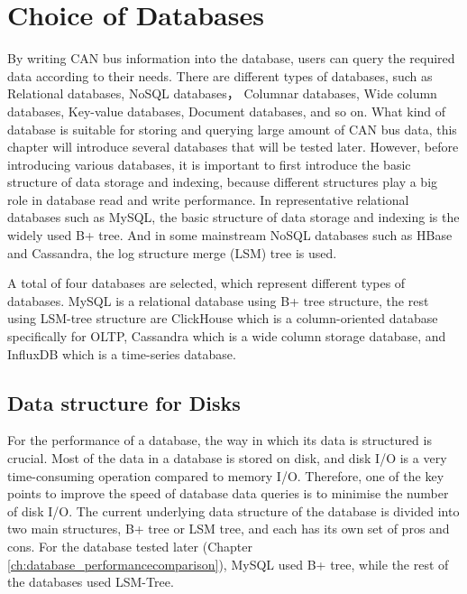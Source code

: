 \chapter{Choice of Databases}
\label{ch:choice_of_databases}
By writing CAN bus information into the database, users can query the required data according to their needs. There are different types of databases, such as Relational databases, NoSQL databases， Columnar databases, Wide column databases, Key-value databases, Document databases, and so on. What kind of database is suitable for storing and querying large amount of CAN bus data, this chapter will introduce several databases that will be tested later. However, before introducing various databases, it is important to first introduce the basic structure of data storage and indexing, because different structures play a big role in database read and write performance. In representative relational databases such as MySQL, the basic structure of data storage and indexing is the widely used B+ tree. And in some mainstream NoSQL databases such as HBase and Cassandra, the log structure merge (LSM) tree is used. 

A total of four databases are selected, which represent different types of databases. MySQL is a relational database using B+ tree structure, the rest using LSM-tree structure are ClickHouse which is a column-oriented database specifically for OLTP, Cassandra which is a wide column storage database, and InfluxDB which is a time-series database.

\section{Data structure for Disks}
\label{lsm_bplus}

For the performance of a database, the way in which its data is structured is crucial. Most of the data in a database is stored on disk, and disk I/O is a very time-consuming operation compared to memory I/O. Therefore, one of the key points to improve the speed of database data queries is to minimise the number of disk I/O\cite[p.~2]{10.1007/s002360050048}. The current underlying data structure of the database is divided into two main structures, B+ tree or LSM tree, and each has its own set of pros and cons. For the database tested later (Chapter \ref{ch:database_performancecomparison}), MySQL used B+ tree, while the rest of the databases used LSM-Tree.

